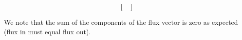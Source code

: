 \begin{equation}
\begin{bmatrix}
  \end{bmatrix}
\end{equation}

We note that the sum of the components of the flux vector is zero as expected (flux in must equal flux out).
